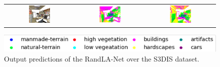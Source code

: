 \begin{figure}[h!]
\begin{tabular}{ccc}
            \includegraphics[width=0.33\textwidth, height=0.18\textheight]{images/seg_output/s3dis_DE/S3DIS_4_RGB.pdf} &
            \includegraphics[width=0.33\textwidth, height=0.18\textheight]{images/seg_output/s3dis_DE/S3DIS_4_Pred.pdf}&
            \includegraphics[width=0.33\textwidth, height=0.18\textheight]{images/seg_output/s3dis_DE/office_42.pdf} \\
        \end{tabular}
        \includegraphics[scale=0.65]{images/legend.png}
        \caption{Output predictions of the RandLA-Net over the S3DIS dataset.}
        \label{fig:de_s3dis_vis}
    \end{figure}
